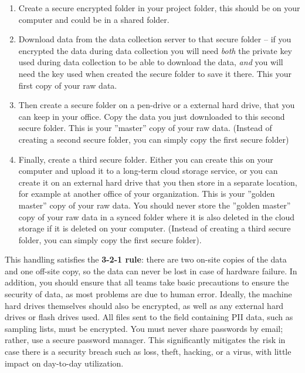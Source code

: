 \begin{enumerate}
	\item Create a secure encrypted folder in your project folder, this should be on
	your computer and could be in a shared folder.
	\item Download data from the data collection server to that secure folder -- if
	you encrypted the data during data collection you will need \textit{both} the
	private key used during data collection to be able to download the data, \textit{and}
	you will need the key used when created the secure folder to save it there. This
	your first copy of your raw data.
	\item Then create a secure folder on a pen-drive or a external hard drive, that you
	can keep in your office. Copy the data you just downloaded to this second secure
	folder. This is your ''master'' copy of your raw data. (Instead of creating a second
	secure folder, you can simply copy the first secure folder)
	\item Finally, create a third secure folder. Either you can create this on your
	computer and upload it to a long-term cloud storage service, or you can create it on
	an external hard drive that you then store in a separate location, for example at
	another office of your organization. This is your ''golden master'' copy of your raw
	data. You should never store the ''golden master'' copy of your raw data in a synced
	folder where it is also deleted in the cloud storage if it is deleted on your computer.
	(Instead of creating a third secure folder, you can simply copy the first secure folder).
\end{enumerate}

This handling satisfies the \textbf{3-2-1 rule}: there are
two on-site copies of the data and one off-site copy, so the data can never
be lost in case of hardware failure.
In addition, you should ensure that all teams take basic precautions to ensure the security of data, as most problems are due to human error.
Ideally, the machine hard drives themselves should also be encrypted,
as well as any external hard drives or flash drives used.
All files sent to the field containing PII data, such as sampling lists, must be encrypted.
You must never share passwords by email; rather, use a secure password manager.
This significantly mitigates the risk in case there is a security breach
such as loss, theft, hacking, or a virus, with little impact on day-to-day utilization.


